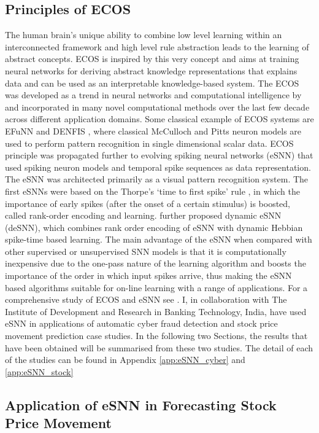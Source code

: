 \subsection{Principles of ECOS}
The human brain's unique ability to combine low level learning within an interconnected framework and high level rule abstraction leads to the learning of abstract concepts. ECOS is inspired by this very concept and aims at training neural networks for deriving abstract knowledge representations that explains data and can be used as an interpretable knowledge-based system. The ECOS was developed as a trend in neural networks and computational intelligence by \citet{kasabov2001evolving} and incorporated in many novel computational methods over the last few decade across different application domains. Some classical example of ECOS systems are EFuNN \citep{kasabov1998evolving} and DENFIS \citep{kasabov2002denfis}, where classical McCulloch and Pitts neuron models are used to perform pattern recognition in single dimensional scalar data. ECOS principle was propagated further to evolving spiking neural networks (eSNN) that used spiking neuron models and temporal spike sequences as data representation. The eSNN was architected primarily as a visual pattern recognition system. The first eSNNs were based on the Thorpe’s `time to first spike' rule \citep{thorpe2001spike}, in which the importance of early spikes (after the onset of a certain stimulus) is boosted, called rank-order encoding and learning. \cite{kasabov2013dynamic} further proposed dynamic eSNN (deSNN), which combines rank order encoding of eSNN with dynamic Hebbian spike-time based learning. The main advantage of the eSNN when compared with other supervised or unsupervised SNN models is that it is computationally inexpensive due to the one-pass nature of the learning algorithm and boosts the importance of the order in which input spikes arrive, thus making the eSNN based algorithms suitable for on-line learning with a range of applications. For a comprehensive study of ECOS and eSNN see \citep{watts2009decade, wysoski2010evolving}. I, in collaboration with The Institute of Development and Research in Banking Technology, India, have used eSNN in applications of automatic cyber fraud detection and stock price movement prediction case studies. In the following two Sections, the results that have been obtained will be summarised from these two studies. The detail of each of the studies can be found in Appendix \ref{app:eSNN_cyber} and \ref{app:eSNN_stock}
\subsection{Application of eSNN in Forecasting Stock Price Movement}      

